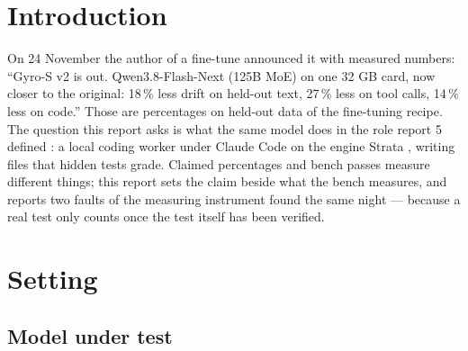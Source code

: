 \clearpage


\tableofcontents
{}
\listoftables
\clearpage

\renewcommand{\sectionmark}[1]{\markboth{\thesection.\ #1}{\thesection.\ #1}}
\renewcommand{\subsectionmark}[1]{}
\clearpage


\section{Introduction}\label{sec:intro}

On 24 November the author of a fine-tune announced it with measured numbers: ``Gyro-S v2 is out. Qwen3.8-Flash-Next
(125B MoE) on one 32 GB card, now closer to the original: 18\,\% less drift on held-out text, 27\,\% less on tool
calls, 14\,\% less on code.'' Those are percentages on held-out data of the fine-tuning recipe. The question this
report asks is what the same model does in the role report 5 defined \citep{Nott-2026aa}: a local coding worker under
Claude Code \citep{Anthropic-2026aa} on the engine Strata \citep{Strata-2026aa}, writing files that hidden tests grade.
Claimed percentages and bench passes measure different things; this report sets the claim beside what the bench measures,
and reports two faults of the measuring instrument found the same night --- because a real test only
counts once the test itself has been verified.

\section{Setting}\label{sec:setting}

\subsection{Model under test}

